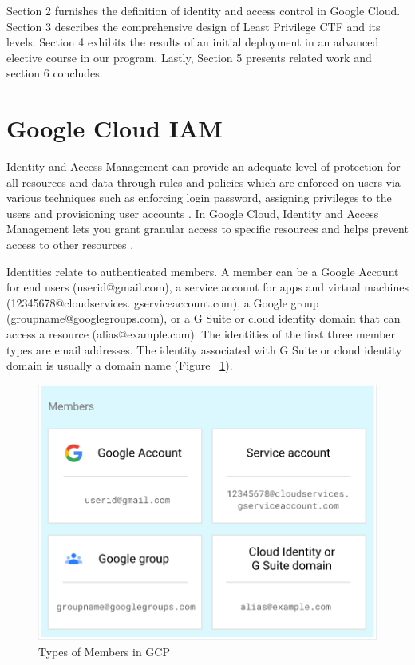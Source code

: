 \documentclass[sigconf]{acmart}
\begin{document}
Section 2 furnishes the definition of identity and access control in Google Cloud. Section 3 describes the comprehensive design of Least Privilege CTF and its levels. Section 4 exhibits the results of an initial deployment in an advanced elective course in our program. Lastly, Section 5 presents related work and section 6 concludes.

\section{Google Cloud IAM}
Identity and Access Management can provide an adequate level of protection for all resources and data through rules and policies which are enforced on users via various techniques such as enforcing login password, assigning privileges to the users and provisioning user accounts \cite{AlmullaSameeraAbdulrahmanandYeun2010}.
In Google Cloud,  Identity and Access Management lets you grant granular access to specific resources and helps prevent access to other resources \cite{Googlecloudiam}.

Identities relate to authenticated members. A member can be a Google Account for end users (userid@gmail.com), a service account for apps and virtual machines (12345678@cloudservices.
gserviceaccount.com), a Google group (groupname@googlegroups.com), or a G Suite or cloud identity domain that can access a resource (alias@example.com). The identities of the first three member types are email addresses. The identity associated with G Suite or cloud identity domain is usually a domain name (Figure ~\ref{fig:mem}).
\begin{figure}[h]
  \centering
  \includegraphics[width=\linewidth]{mem}
  \caption {Types of Members in GCP}
  \label{fig:mem}
\end{figure}
\end{document}

